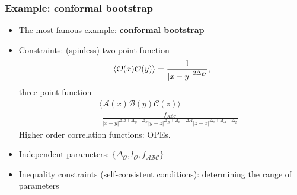\documentclass{beamer}
\newcommand{\concept}[1]{\textbf{#1}}
\begin{document}
\begin{frame}
\frametitle{Example: conformal bootstrap}

\begin{itemize}
    \item The most famous example: \concept{conformal bootstrap}
    \item Constraints: (spinless) two-point function 
    \begin{equation}
        \expval*{\mathcal{O}(x) \mathcal{O}(y)} = \frac{1}{\abs*{x - y}^{2 \Delta_\mathcal{O}}},
    \end{equation}
    three-point function 
    \begin{equation}
        \begin{aligned}
            &\quad \langle\mathcal{A}(x) \mathcal{B}(y) \mathcal{C}(z)\rangle \\
            &= \frac{f_{\mathcal{A B C}}}{|x-y|^{\Delta \mathcal{A}+\Delta_{\mathcal{B}}-\Delta_{\mathcal{C}}}|y-z|^{\Delta_{\mathcal{B}}+\Delta_{\mathcal{C}}-\Delta \mathcal{A}}|z-x|^{\Delta_{\mathcal{C}}+\Delta_{\mathcal{A}}-\Delta_{\mathcal{B}}}}
        \end{aligned}
    \end{equation}
    Higher order correlation functions: OPEs. 
    \item Independent parameters: $\{\Delta_{\mathcal{O}}, l_{\mathcal{O}}, f_{\mathcal{A} \mathcal{B} \mathcal{C}}\}$
    \item Inequality constraints (self-consistent conditions): determining the range of parameters
\end{itemize}

\end{frame}
\end{document}
